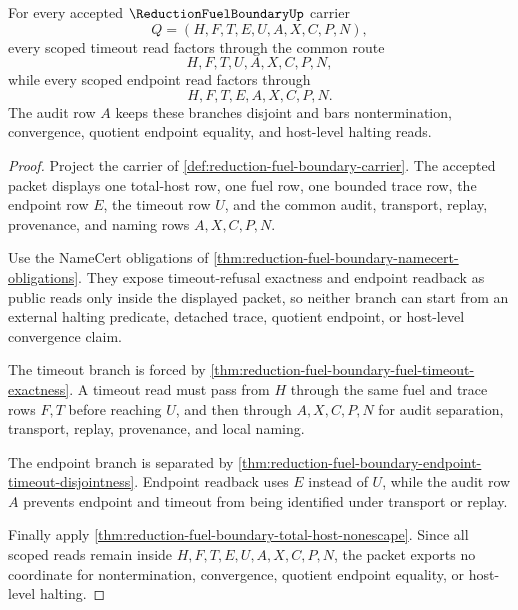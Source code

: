 \begin{theorem}
\label{thm:reduction-fuel-boundary-scoped-timeout-route}
For every accepted $\ReductionFuelBoundaryUp$ carrier
$$
Q=(H,F,T,E,U,A,X,C,P,N),
$$
every scoped timeout read factors through the common route
$$
H,F,T,U,A,X,C,P,N,
$$
while every scoped endpoint read factors through
$$
H,F,T,E,A,X,C,P,N .
$$
The audit row $A$ keeps these branches disjoint and bars nontermination, convergence, quotient endpoint equality, and host-level halting reads.
\end{theorem}
\begin{proof}
Project the carrier of \autoref{def:reduction-fuel-boundary-carrier}. The accepted packet displays one total-host row, one fuel row, one bounded trace row, the endpoint row $E$, the timeout row $U$, and the common audit, transport, replay, provenance, and naming rows $A,X,C,P,N$.

Use the NameCert obligations of \autoref{thm:reduction-fuel-boundary-namecert-obligations}. They expose timeout-refusal exactness and endpoint readback as public reads only inside the displayed packet, so neither branch can start from an external halting predicate, detached trace, quotient endpoint, or host-level convergence claim.

The timeout branch is forced by \autoref{thm:reduction-fuel-boundary-fuel-timeout-exactness}. A timeout read must pass from $H$ through the same fuel and trace rows $F,T$ before reaching $U$, and then through $A,X,C,P,N$ for audit separation, transport, replay, provenance, and local naming.

The endpoint branch is separated by \autoref{thm:reduction-fuel-boundary-endpoint-timeout-disjointness}. Endpoint readback uses $E$ instead of $U$, while the audit row $A$ prevents endpoint and timeout from being identified under transport or replay.

Finally apply \autoref{thm:reduction-fuel-boundary-total-host-nonescape}. Since all scoped reads remain inside $H,F,T,E,U,A,X,C,P,N$, the packet exports no coordinate for nontermination, convergence, quotient endpoint equality, or host-level halting.
\end{proof}

